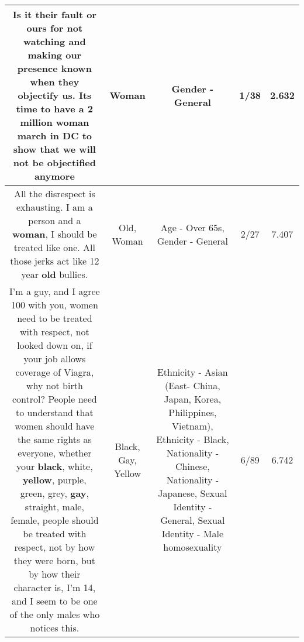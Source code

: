 \documentclass[11pt]{article}
\newlength\mylength
\begin{document}
\begin{center}
\begin{longtable}{|C{.65\mylength}|C{.30\mylength}|C{.12\mylength}|C{.12\mylength}|C{.12\mylength}|}
  \small Is it their fault or ours for not watching and making our presence known when they objectify us. Its time to have a 2 million \textbf{woman} march in DC to show that we will not be objectified anymore\normalsize   & Woman & Gender - General & 1/38 & 2.632 \\  \hline
  \small All the disrespect is exhausting.  I am a person and a \textbf{woman}, I should be treated like one.  All those jerks act like 12 year \textbf{old} bullies.\normalsize   & Old, Woman & Age - Over 65s, Gender - General & 2/27 & 7.407 \\  \hline
  \small I'm a guy, and I agree 100 with you, women need to be treated with respect, not looked down on, if your job allows coverage of Viagra, why not birth control? People need to understand that women should have the same rights as everyone, whether your \textbf{black}, white, \textbf{y\textbf{e\textbf{llow}}}, purple, green, grey, \textbf{g\textbf{ay}}, straight, male, female, people should be treated with respect, not by how they were born, but by how their character is, I'm 14, and I seem to be one of the only males who notices this.\normalsize   & Black, Gay, Yellow & Ethnicity - Asian (East- China, Japan, Korea, Philippines, Vietnam), Ethnicity - Black, Nationality - Chinese, Nationality - Japanese, Sexual Identity - General, Sexual Identity - Male homosexuality & 6/89 & 6.742 \\  \hline
  
\end{longtable}
\end{center}
\end{document}

